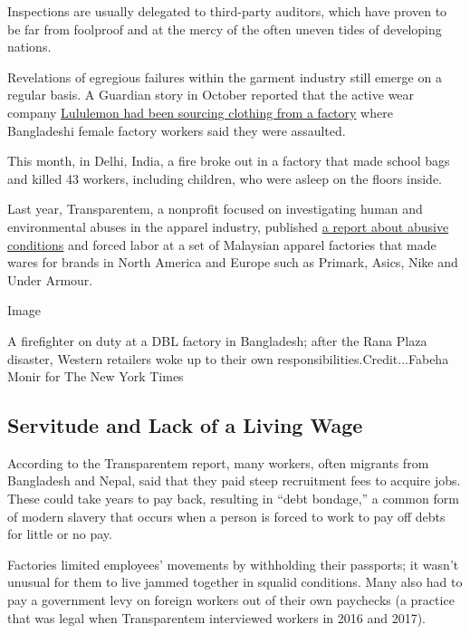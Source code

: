 Inspections are usually delegated to third-party auditors, which have
proven to be far from foolproof and at the mercy of the often uneven
tides of developing nations.

Revelations of egregious failures within the garment industry still
emerge on a regular basis. A Guardian story in October reported that the
active wear company
\href{https://www.theguardian.com/global-development/2019/oct/14/workers-making-lululemon-leggings-claim-they-are-beaten}{Lululemon
had been sourcing clothing from a factory} where Bangladeshi female
factory workers said they were assaulted.

This month, in Delhi, India, a fire broke out in a factory that made
school bags and killed 43 workers, including children, who were asleep
on the floors inside.

Last year, Transparentem, a nonprofit focused on investigating human and
environmental abuses in the apparel industry, published
\href{https://www.transparentem.com/projects/}{a report about abusive
conditions} and forced labor at a set of Malaysian apparel factories
that made wares for brands in North America and Europe such as Primark,
Asics, Nike and Under Armour.

Image

A firefighter on duty at a DBL factory in Bangladesh; after the Rana
Plaza disaster, Western retailers woke up to their own
responsibilities.Credit...Fabeha Monir for The New York Times

\hypertarget{servitude-and-lack-of-a-living-wage}{%
\subsection{Servitude and Lack of a Living
Wage}\label{servitude-and-lack-of-a-living-wage}}

According to the Transparentem report, many workers, often migrants from
Bangladesh and Nepal, said that they paid steep recruitment fees to
acquire jobs. These could take years to pay back, resulting in ``debt
bondage,'' a common form of modern slavery that occurs when a person is
forced to work to pay off debts for little or no pay.

Factories limited employees' movements by withholding their passports;
it wasn't unusual for them to live jammed together in squalid
conditions. Many also had to pay a government levy on foreign workers
out of their own paychecks (a practice that was legal when Transparentem
interviewed workers in 2016 and 2017).

